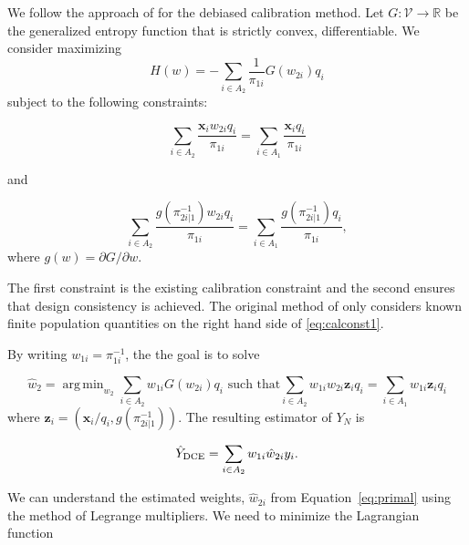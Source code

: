 \documentclass[12pt]{article}
\DeclareMathOperator*{\argmin}{arg\,min}
\newcommand{\R}{\mathbb{R}}
\renewcommand{\bf}[1]{\mathbf{#1}}
\begin{document}
We follow the approach of \cite{kwon2024debiased} for the debiased calibration
method. Let $G: \mathcal{V} \to \R$ be the generalized entropy function that is strictly convex, differentiable.  
We consider maximizing  
\begin{equation}\label{eq:primalloss}
  H(w) = - \sum_{i \in A_2} \frac{1}{\pi_{1i}} G(w_{2i}) q_i
\end{equation} 
subject to the following constraints:

\begin{equation}\label{eq:calconst1}
  \sum_{i \in A_2} \frac{\bf x_i w_{2i}q_i}{\pi_{1i}} = 
\sum_{i \in A_1} \frac{\bf x_iq_i}{\pi_{1i}}
\end{equation}

and 

\begin{equation}\label{eq:calconst2}
  \sum_{i \in A_2} \frac{g(\pi_{2i|1}^{-1})w_{2i}q_i}{\pi_{1i}} = 
  \sum_{i \in A_1} \frac{g(\pi_{2i|1}^{-1})q_i}{\pi_{1i}}, 
\end{equation}
where $g(w) = \partial G / \partial w$. 

The first constraint is the existing calibration constraint and the second
ensures that design consistency is achieved. 
The original method of \cite{kwon2024debiased} only considers known finite
population quantities on the right hand side of \eqref{eq:calconst1}.

By writing $w_{1i} = \pi_{1i}^{-1}$, the the goal is to solve

\begin{equation}\label{eq:primal}
  \hat w_2  = \argmin_{w_{2}} \sum_{i \in A_2} w_{1i} G(w_{2i}) q_i 
  \text{ such that}
  \sum_{i \in A_2} w_{1i} w_{2i} \bf z_i q_i = \sum_{i \in A_1} w_{1i} \bf z_i q_i
\end{equation}
where  $\bf z_i = (\bf x_i / q_i, g(\pi_{2i|1}^{-1}))$. The resulting 
estimator of $Y_N$ is 

\begin{equation}\label{eq:tpest}
\hat Y_{\rm DCE} = \sum_{i \in A_2} w_{1i} \hat w_{2i} y_i.
\end{equation}


We can understand the estimated weights, $\hat w_{2i}$ from 
Equation~\ref{eq:primal}
using the method of Legrange multipliers.
We need to minimize the Lagrangian function
\end{document}
